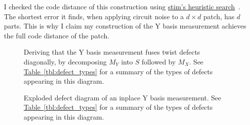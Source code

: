 \documentclass[onecolumn,unpublished,a4paper]{quantumarticle}
\theoremstyle{definition}
\theoremstyle{definition}
\theoremstyle{definition}
\newcommand{\tbl}[1]{\hyperref[tbl:#1]{Table~\ref*{tbl:#1}}}
\begin{document}
I checked the code distance of this construction using \href{https://github.com/quantumlib/Stim/blob/main/doc/python_api_reference_vDev.md#stim.Circuit.search_for_undetectable_logical_errors}{stim's heuristic search}~\cite{gidney2021stim}.
The shortest error it finds, when applying circuit noise to a $d \times d$ patch, has $d$ parts.
This is why I claim my construction of the Y basis measurement achieves the full code distance of the patch.

\begin{figure}
    \centering
    \caption{
        Deriving that the Y basis measurement fuses twist defects diagonally, by decomposing $M_Y$ into $S$ followed by $M_X$.
        See \tbl{defect_types} for a summary of the types of defects appearing in this diagram.
    }
    \label{fig:topological_decomposition}
\end{figure}

\begin{figure}
    \centering
    \caption{
        Exploded defect diagram of an inplace Y basis measurement.
        See \tbl{defect_types} for a summary of the types of defects appearing in this diagram.
    }
    \label{fig:topological_explosion}
\end{figure}
\end{document}
